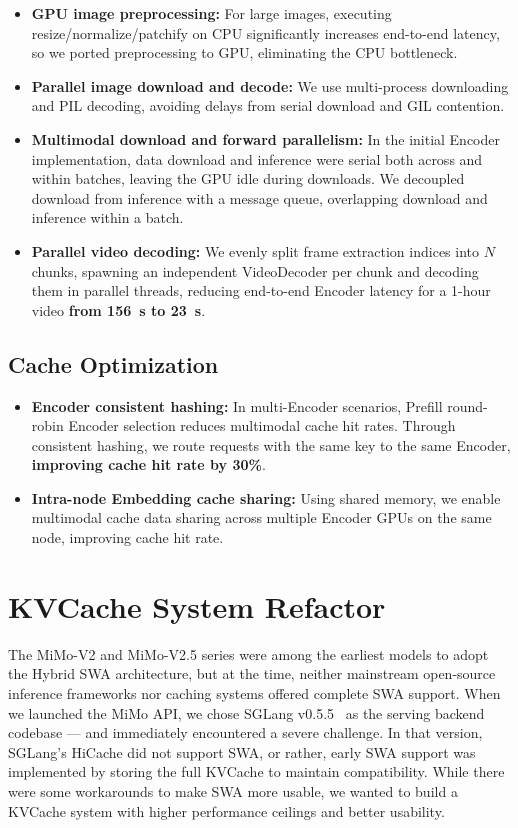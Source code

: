 \begin{itemize}
    \item \textbf{GPU image preprocessing:} For large images, executing resize/normalize/patchify on CPU significantly increases end-to-end latency, so we ported preprocessing to GPU, eliminating the CPU bottleneck.
    \item \textbf{Parallel image download and decode:} We use multi-process downloading and PIL decoding, avoiding delays from serial download and GIL contention.
    \item \textbf{Multimodal download and forward parallelism:} In the initial Encoder implementation, data download and inference were serial both across and within batches, leaving the GPU idle during downloads. We decoupled download from inference with a message queue, overlapping download and inference within a batch.
    \item \textbf{Parallel video decoding:} We evenly split frame extraction indices into $N$ chunks, spawning an independent VideoDecoder per chunk and decoding them in parallel threads, reducing end-to-end Encoder latency for a 1-hour video \textbf{from 156~s to 23~s}.
\end{itemize}

\subsection{Cache Optimization}

\begin{itemize}
    \item \textbf{Encoder consistent hashing:} In multi-Encoder scenarios, Prefill round-robin Encoder selection reduces multimodal cache hit rates. Through consistent hashing, we route requests with the same key to the same Encoder, \textbf{improving cache hit rate by 30\%}.
    \item \textbf{Intra-node Embedding cache sharing:} Using shared memory, we enable multimodal cache data sharing across multiple Encoder GPUs on the same node, improving cache hit rate.
\end{itemize}

\section{KVCache System Refactor}

The MiMo-V2 and MiMo-V2.5 series were among the earliest models to adopt the Hybrid SWA architecture, but at the time, neither mainstream open-source inference frameworks nor caching systems offered complete SWA support. 
When we launched the MiMo API, we chose SGLang v0.5.5~\citep{sglang} as the serving backend codebase --- and immediately encountered a severe challenge. 
In that version, SGLang's HiCache did not support SWA, or rather, early SWA support was implemented by storing the full KVCache to maintain compatibility. While there were some workarounds to make SWA more usable, we wanted to build a KVCache system with higher performance ceilings and better usability.

